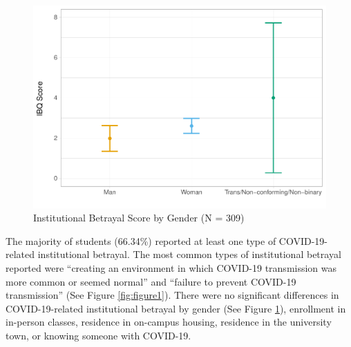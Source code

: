 \documentclass[
  english,
  man, noextraspace]{apa6}
\begin{document}
\begin{figure}[H]

{\centering \includegraphics[width=\textwidth]{papaja_doc_files/figure-latex/figure2-1} 

}

\caption{Institutional Betrayal Score by Gender (N = 309) 
}\label{fig:figure2}
\end{figure}

The majority of students (66.34\%) reported at least one type of COVID-19-related institutional betrayal. The most common types of institutional betrayal reported were \enquote{creating an environment in which COVID-19 transmission was more common or seemed normal} and \enquote{failure to prevent COVID-19 transmission} (See Figure \ref{fig:figure1}). There were no significant differences in COVID-19-related institutional betrayal by gender (See Figure \ref{fig:figure2}), enrollment in in-person classes, residence in on-campus housing, residence in the university town, or knowing someone with COVID-19.
\end{document}
